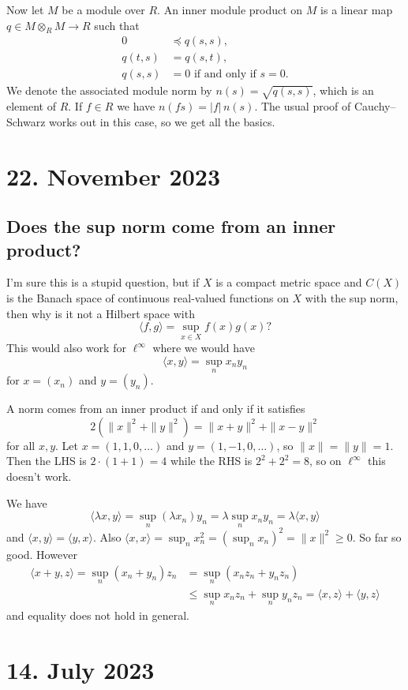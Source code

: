 \documentclass[11pt]{amsart}
\theoremstyle{definition}
\def\<{\langle}
\def\>{\rangle}
\begin{document}
Now let $M$ be a module over $R$.
An inner module product on $M$ is a linear map $q \in M \otimes_R M \to R$ such
that
\begin{align*}
	0 &\preceq q(s, s),
	\\
	q(t, s) &= q(s, t),
	\\
	q(s, s) &= 0 \text{ if and only if $s = 0$}.
\end{align*}
We denote the associated module norm by $n(s) = \sqrt{q(s, s)}$, which is
an element of $R$.
If $f \in R$ we have $n(fs) = |f| \, n(s)$.
The usual proof of Cauchy--Schwarz works out in this case, so we get all the
basics.


\section{22. November 2023}

\subsection*{Does the sup norm come from an inner product?}

I'm sure this is a stupid question, but if $X$ is a compact metric space
and $C(X)$ is the Banach space of continuous real-valued functions on $X$
with the sup norm, then why is it not a Hilbert space with
\[
\< f, g \> = \sup_{x \in X} f(x) g(x) ?
\]
This would also work for $\ell^\infty$ where we would have
\[
\< x, y \> = \sup_n x_n y_n
\]
for $x = (x_n)$ and $y = (y_n)$.

A norm comes from an inner product if and only if it satisfies
\[
2(\|x\|^2 + \|y\|^2) = \|x+y\|^2 + \|x-y\|^2
\]
for all $x,y$.
Let $x = (1,1,0,\ldots)$ and $y = (1,-1,0,\ldots)$, so $\|x\| = \|y\| = 1$.
Then the LHS is $2 \cdot (1 + 1) = 4$ while the RHS is
$2^2 + 2^2 = 8$, so on $\ell^\infty$ this doesn't work.

We have
\[
\<\lambda x, y\>
= \sup_n (\lambda x_n) y_n
= \lambda \sup_n x_n y_n
= \lambda \<x, y\>
\]
and $\<x, y\> = \<y, x\>$.
Also $\<x, x\> = \sup_n x_n^2 = (\sup_n x_n)^2 = \| x \|^2 \geq 0$.
So far so good.
However
\begin{align*}
\<x + y, z\>
= \sup_n (x_n + y_n) z_n
&= \sup_n (x_n z_n + y_n z_n)
\\
&\leq \sup_n x_n z_n + \sup_n y_n z_n
= \< x, z \> + \< y, z \>
\end{align*}
and equality does not hold in general.


\section{14. July 2023}
\end{document}
